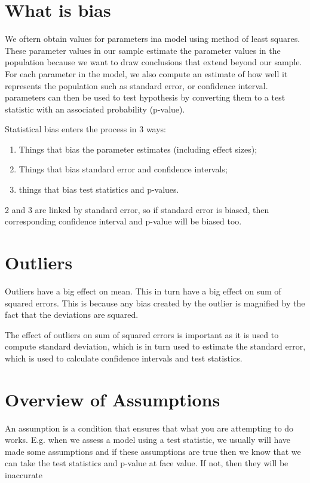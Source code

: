 \section{What is bias}
We oftern obtain values for parameters ina model using method of least squares. These parameter values in our sample estimate the parameter values in the population because we want to draw conclusions that extend beyond our sample. For each parameter in the model, we also compute an estimate of how well it represents the population such as standard error, or confidence interval. parameters can then be used to test hypothesis by converting them to a test statistic with an associated probability (p-value).

Statistical bias enters the process in 3 ways:
\begin{enumerate}
\item Things that bias the parameter estimates (including effect sizes);
\item Things that bias standard error and confidence intervals;
\item things that bias test statistics and p-values.
\end{enumerate}

2 and 3 are linked by standard error, so if standard error is biased, then corresponding confidence interval and p-value will be biased too.

\section{Outliers}
Outliers have a big effect on mean. This in turn have a big effect on sum of squared errors. This is because any bias created by the outlier is magnified by the fact that the deviations are squared. 

The effect of outliers on sum of squared errors is important as it is used to compute standard deviation, which is in turn used to estimate the standard error, which is used to calculate confidence intervals and test statistics.

\section{Overview of Assumptions}

An assumption is a condition that ensures that what you are attempting to do works. E.g. when we assess a model using a test statistic, we usually will have made some assumptions and if these assumptions are true then we know that we can take the test statistics and p-value at face value. If not, then they will be inaccurate


